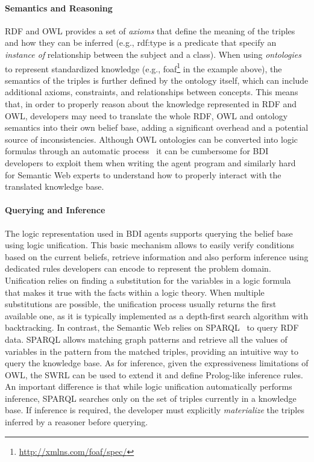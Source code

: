 \documentclass[
]{ceurart}
\begin{document}
\paragraph{Semantics and Reasoning}
\ac{RDF} and \ac{OWL} provides a set of \emph{axioms} that define the meaning of the triples and how they can be inferred (e.g., \textsf{rdf:type} is a predicate that specify an \emph{instance of} relationship between the subject and a class).
%
When using \emph{ontologies} to represent standardized knowledge (e.g., \textsf{foaf}\footnote{\url{http://xmlns.com/foaf/spec/}} in the example above), 
the semantics of the triples is further defined by the ontology itself,
which can include additional axioms, constraints, and relationships between concepts.
%
This means that, in order to properly reason about the knowledge represented in \ac{RDF} and \ac{OWL},
developers may need to translate the whole \ac{RDF}, \ac{OWL} and ontology semantics into their own belief base, adding a significant overhead and a potential source of inconsistencies. 
Although \ac{OWL} ontologies can be converted into logic formulas through an automatic process~\cite{samuel2008tplp}
it can be cumbersome for \ac{BDI} developers to exploit them when writing the agent program
and similarly hard for Semantic Web experts to understand how to properly interact with the translated knowledge base.

\paragraph{Querying and Inference}

The logic representation used in \ac{BDI} agents supports querying the belief base using logic unification.
%
This basic mechanism allows to easily verify conditions based on the current beliefs, retrieve information and also perform inference using dedicated rules developers can encode to represent the problem domain.
%
Unification relies on finding a substitution for the variables in a logic formula that makes it true with the facts within a logic theory. When multiple substitutions are possible, the unification process usually returns the first available one, as it is typically implemented as a depth-first search algorithm with backtracking.
%
In contrast, the Semantic Web relies on \acs{SPARQL}~\cite{sparqlprotocol} to query \ac{RDF} data.
\acs{SPARQL} allows matching graph patterns and retrieve all the values of variables in the pattern from the matched triples, 
providing an intuitive way to query the knowledge base.
%
As for inference, given the expressiveness limitations of \ac{OWL}, the \ac{SWRL} can be used to extend it and define Prolog-like inference rules.
%
An important difference is that while logic unification automatically performs inference, \acs{SPARQL} searches only on the set of triples currently in a knowledge base. If inference is required, the developer must explicitly \emph{materialize} the triples inferred by a reasoner before querying.
\end{document}
